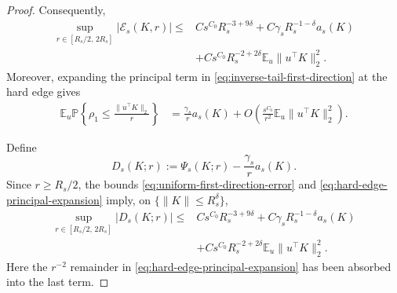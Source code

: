 \documentclass[11pt]{article}
\newcommand{\Pbb}{\mathbb P}
\newcommand{\Ebb}{\mathbb E}
\newcommand{\1}{\mathbf 1}
\begin{document}
\begin{proof}
Consequently,
\begin{align}
        \sup_{r\in[R_s/2,\,2R_s]}
        |\mathcal E_s(K,r)|
        \le{}&
        C s^{C_0}R_s^{-3+9\delta}
        +
        C\gamma_sR_s^{-1-\delta}a_s(K)
\nonumber\\
        &+
        C s^{C_0}R_s^{-2+2\delta}
        \Ebb_u\|u^\top K\|_2^2.
        \label{eq:uniform-first-direction-error}
\end{align}
Moreover, expanding the principal term in
\eqref{eq:inverse-tail-first-direction} at the hard edge gives
\begin{align}
        \Ebb_u
        \Pbb\left\{
        \rho_1
        \le
        \frac{\|u^\top K\|_2}{r}
        \right\}
        &=
        \frac{\gamma_s}{r}a_s(K)
        +
        O\left(
        \frac{s^{C_0}}{r^2}
        \Ebb_u\|u^\top K\|_2^2
        \right).
        \label{eq:hard-edge-principal-expansion}
\end{align}

Define
\[
        D_s(K;r)
        :=
        \Psi_s(K;r)
        -
        \frac{\gamma_s}{r}a_s(K).
\]
Since \(r\ge R_s/2\), the bounds
\eqref{eq:uniform-first-direction-error} and
\eqref{eq:hard-edge-principal-expansion} imply, on
\(\{\|K\|\le R_s^\delta\}\),
\begin{align}
        \sup_{r\in[R_s/2,\,2R_s]}
        |D_s(K;r)|
        \le{}&
        C s^{C_0}R_s^{-3+9\delta}
        +
        C\gamma_sR_s^{-1-\delta}a_s(K)
\nonumber\\
        &+
        C s^{C_0}R_s^{-2+2\delta}
        \Ebb_u\|u^\top K\|_2^2.
        \label{eq:combined-specialized-error}
\end{align}
Here the \(r^{-2}\) remainder in
\eqref{eq:hard-edge-principal-expansion} has been absorbed into the
last term.


\end{proof}
\end{document}
